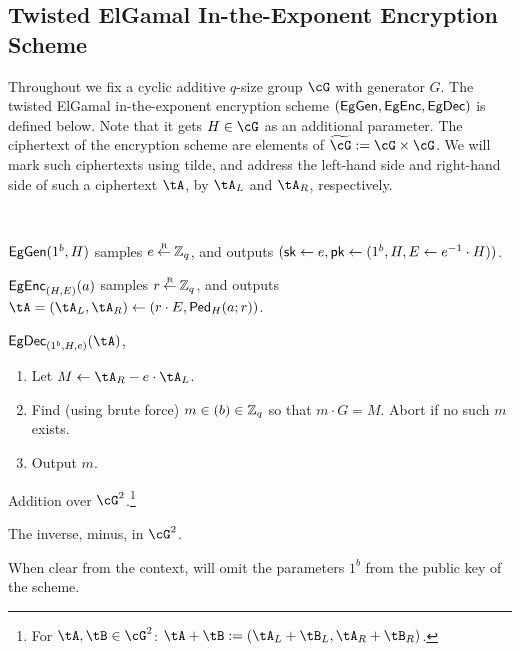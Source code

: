   






\newcommand{\tcG}{\widetilde{\cG}}
\subsection{Twisted ElGamal In-the-Exponent Encryption Scheme}\label{sec:ChanksEg:Eg}
Throughout we fix a cyclic  additive $q$-size group $\cG$ with generator $G$. The  twisted ElGamal in-the-exponent encryption scheme $(\mathsf{EgGen},\mathsf{EgEnc},\mathsf{EgDec})$ is defined below. Note that it  gets  $H\in \cG$ as an  additional parameter. The ciphertext of the encryption scheme are elements of $\tcG \eqdef \cG \times \cG$. We will mark such  ciphertexts   using tilde, and  address  the left-hand side and right-hand side of such  a ciphertext $\tA$,  by $\tA_L$ and  $\tA_R$, respectively. 




\begin{algorithm}\label{alg:tEGinExp}~
	
	
	\item[Key generation:] $\mathsf{EgGen}(1^b,H)$ samples $e\mathbin{\stackrel{\mbox{\tiny R}}{\leftarrow}} {\mathbb Z}_q$, and outputs $({\mathsf{sk}} 
	\leftarrow e,{\mathsf{pk}} \leftarrow (1^b,H,E\leftarrow  e^{-1}\cdot H))$.
	
	\item[Encryption:] $\mathsf{EgEnc}_{(H,E)}(a)$  samples $r\mathbin{\stackrel{\mbox{\tiny R}}{\leftarrow}} {\mathbb Z}_q$, and outputs  $\tA  = (\tA _L,\tA _R)\asn (r\cdot E, \Ped_H(a;r))$. 
	\item[Decryption:] $\EgDec_{(1^b,H,e)}(\tA)$,   
	\begin{enumerate}
		\item 	Let $M \asn \tA_R - e\cdot \tA_L$.
		
		\item Find (using brute force) $m\in (b) \in {\mathbb Z}_q$ so that $m\cdot G = M$. Abort if no such $m$ exists. 
		\item Output $m$.
	\end{enumerate}
	
	\item[Addition:] Addition over  $\cG^2$.\footnote{For $\tA,\tB \in \cG^2$: $\tA +\tB \eqdef (\tA_L+\tB_L,\tA_R+\tB_R)$.}
	
	\item[Minus:]  The inverse, \ie minus, in $\cG^2$.
	
\end{algorithm}	
When clear from the context,  will omit the parameters $1^b$ from the public key of the scheme.

